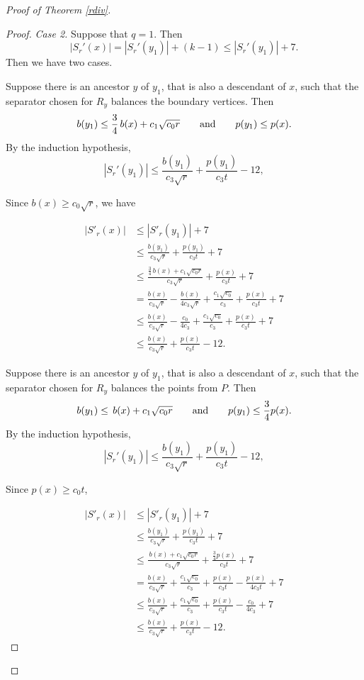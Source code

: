 \documentclass[11pt]{article}
\theoremstyle{plain}
\theoremstyle{definition}
\theoremstyle{remark}
\begin{document}
\begin{proof}[Proof of Theorem \ref{rdiv}]
\begin{proof}
\noindent \emph{Case 2.}  Suppose that $q = 1$.  Then
\[
|S_r'(x)|=|S_r'(y_1)|+(k-1)\le |S_r'(y_1)|+7.
\]
Then we have two cases.   

\smallskip
{} Suppose there is an ancestor $y$ of $y_1$, that is also a descendant of \(x\), such that the separator chosen for $R_y$ balances the boundary
vertices.  Then
\[
b(y_1)\le \frac34\,b(x)+c_1\sqrt{c_0r}
\qquad \textnormal{and}\qquad
p(y_1)\le p(x).
\]
By the induction hypothesis,
\[
|S_r'(y_1)|\le \frac{b(y_1)}{c_3\sqrt r}+\frac{p(y_1)}{c_3t}-12,
\]

\noindent Since $b(x) \geq c_0\sqrt{r}$, we have

\begin{align*}
|S'_r(x)|
  &\leq |S'_r(y_1)| + 7 \\
  &\le \frac{b(y_1)}{c_3\sqrt r} + \frac{p(y_1)}{c_3 t} +7 \\
  &\le \frac{\frac34\,b(x)+c_1\sqrt{c_0r}}{c_3\sqrt r} + \frac{p(x)}{c_3 t} +7 \\
  &= \frac{b(x)}{c_3\sqrt r}
     - \frac{b(x)}{4c_3\sqrt r}
     + \frac{c_1\sqrt{c_0}}{c_3}
     + \frac{p(x)}{c_3 t}
     +7 \\
  &\le \frac{b(x)}{c_3\sqrt r}
     - \frac{c_0}{4c_3}
     + \frac{c_1\sqrt{c_0}}{c_3}
     + \frac{p(x)}{c_3 t}
     +7 \\
  &\le \frac{b(x)}{c_3\sqrt r} + \frac{p(x)}{c_3 t} - 12.
\end{align*}

\noindent 

\medskip
 

\smallskip
{} Suppose there is an ancestor $y$ of $y_1$, that is also a descendant of \(x\), such that the separator chosen for $R_y$ balances the points from $P$.  Then
\[
b(y_1)\le \,b(x)+c_1\sqrt{c_0r}
\qquad \textnormal{and}\qquad
p(y_1)\le \frac34p(x).
\]
By the induction hypothesis,
\[
|S_r'(y_1)|\le \frac{b(y_1)}{c_3\sqrt r}+\frac{p(y_1)}{c_3t}-12,
\]

\noindent Since $p(x) \geq c_0t$,

\begin{align*}
|S'_r(x)|
  &\leq |S'_r(y_1)|  + 7 \\
  &\le \frac{b(y_1)}{c_3\sqrt r} + \frac{p(y_1)}{c_3 t} + 7 \\
  &\le \frac{\,b(x)+c_1\sqrt{c_0r}}{c_3\sqrt r} + \frac{\frac34p(x)}{c_3 t}  + 7\\
  &= \frac{b(x)}{c_3\sqrt r}
     + \frac{c_1\sqrt{c_0}}{c_3}
     + \frac{p(x)}{c_3 t}     - \frac{p(x)}{4c_3t}
     +7 \\
  &\le \frac{b(x)}{c_3\sqrt r}
     + \frac{c_1\sqrt{c_0}}{c_3}
     + \frac{p(x)}{c_3 t}     - \frac{c_0}{4c_3}
     + 7\\
  &\le \frac{b(x)}{c_3\sqrt r} + \frac{p(x)}{c_3 t} - 12.
\end{align*}


\end{proof}
\end{proof}
\end{document}
